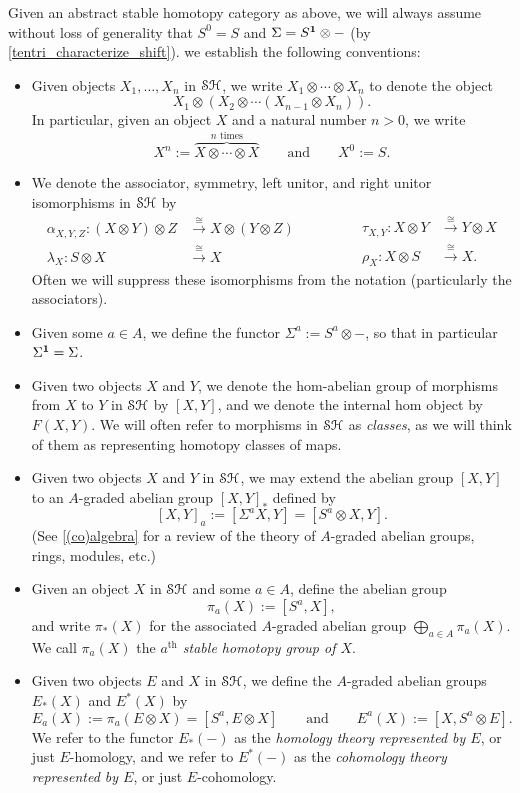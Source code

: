 \documentclass[../main.tex]{subfiles}
\begin{document}
Given an abstract stable homotopy category as above, we will always assume without loss of generality that $S^0=S$ and $\Sigma=S^{\mathbf{1}}\otimes-$ (by \autoref{tentri_characterize_shift}). we establish the following conventions:
\begin{itemize}
	\item Given objects $X_1,\ldots,X_n$ in $\mathcal{SH}$, we write $X_1\otimes\cdots\otimes X_n$ to denote the object
	\[X_1\otimes(X_2\otimes\cdots(X_{n-1}\otimes X_n)).\]
	In particular, given an object $X$ and a natural number $n>0$, we write
	\[X^n:=\overbrace{X\otimes\cdots\otimes X}^\text{$n$ times}\qquad\text{and}\qquad X^0:=S.\]
	\item We denote the associator, symmetry, left unitor, and right unitor isomorphisms in $\mathcal{SH}$ by
	\[\begin{split}
		\alpha_{X,Y,Z}:(X\otimes Y)\otimes Z&\xrightarrow\cong X\otimes(Y\otimes Z) \\
		\lambda_X:S\otimes  X&\xrightarrow\cong X 
	\end{split}\qquad\qquad\begin{split}
		\tau_{X,Y}:X\otimes Y &\xrightarrow\cong Y\otimes X\\
		\rho_X:X\otimes S&\xrightarrow\cong X.
	\end{split}\]
	Often we will suppress these isomorphisms from the notation (particularly the associators).
	\item Given some $a\in A$, we define the functor $\Sigma^a:=S^a\otimes-$, so that in particular $\Sigma^{\mathbf{1}}=\Sigma$.
	\item Given two objects $X$ and $Y$, we denote the hom-abelian group of morphisms from $X$ to $Y$ in $\mathcal{SH}$ by $[X,Y]$, and we denote the internal hom object by $F(X,Y)$. We will often refer to morphisms in $\mathcal{SH}$ as \emph{classes}, as we will think of them as representing homotopy classes of maps.
	\item Given two objects $X$ and $Y$ in $\mathcal{SH}$, we may extend the abelian group $[X,Y]$ to an $A$-graded abelian group $[X,Y]_*$ defined by
	\[[X,Y]_a:=[\Sigma^aX,Y]=[S^a\otimes X,Y].\]
	(See \autoref{(co)algebra} for a review of the theory of $A$-graded abelian groups, rings, modules, etc.)
	\item Given an object $X$ in $\mathcal{SH}$ and some $a\in A$, define the abelian group 
	\[\pi_a(X):=[S^a,X],\]
	and write $\pi_*(X)$ for the associated $A$-graded abelian group $\bigoplus_{a\in A}\pi_a(X)$. We call $\pi_a(X)$ the \emph{$a^\text{th}$ stable homotopy group of $X$}.
	\item Given two objects $E$ and $X$ in $\mathcal{SH}$, we define the $A$-graded abelian groups $E_*(X)$ and $E^*(X)$ by
	\[E_a(X):=\pi_a(E\otimes X)=[S^a,E\otimes X]\qquad\text{and}\qquad E^a(X):=[X,S^a\otimes E].\]
	We refer to the functor $E_*(-)$ as the \emph{homology theory represented by $E$}, or just $E$-homology, and we refer to $E^*(-)$ as the \emph{cohomology theory represented by $E$}, or just $E$-cohomology.
\end{itemize}
\end{document}
